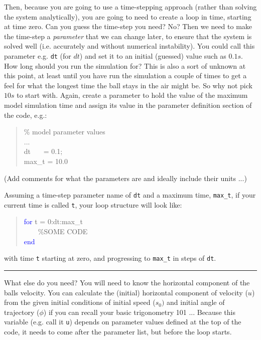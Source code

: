 \documentclass{tufte-book} %
\newenvironment{docspec}{\begin{quotation}\ttfamily\parskip0pt\parindent0pt\ignorespaces}{\end{quotation}}
\begin{document}
Then, because you are going to use a time-stepping approach (rather than solving the system analytically), you are going to need to create a loop in time, starting at time zero. Can you guess the time-step you need? No? Then we need to make the time-step a \textit{parameter} that we can change later, to ensure that the system is solved well (i.e. accurately and without numerical instability). You could call this parameter e.g. \texttt{dt} (for \(dt\)) and set it to an initial (guessed) value such as \(0.1s\). How long should you run the simulation for? This is also a sort of unknown at this point, at least until you have run the simulation a couple of times to get a feel for what the longest time the ball stays in the air might be. So why not pick \(10s\) to start with. Again, create a parameter to hold the value of the maximum model simulation time and assign its value in the parameter definition section of the code, e.g.:
\begin{docspec}
\textcolor[rgb]{0,0.501961,0}{\% model parameter values}\\
...\\
dt \ \ \ = 0.1;\\
max\_t = 10.0
\end{docspec}
(Add comments for what the parameters are and ideally include their units ...)

Assuming a time-step parameter name of \texttt{dt} and a maximum time, \texttt{max\_t}, if your current time is called \texttt{t}, your loop structure will look like:
\begin{docspec}
\textcolor{blue}{for} t = 0:dt:max\_t
\\ \ \ \ \ \textcolor[rgb]{0,0.501961,0}{\%SOME CODE}
\\\textcolor{blue}{end}
\end{docspec}
with time \texttt{t} starting at zero, and progressing to \texttt{max\_t} in steps of \texttt{dt}.

\vspace{1mm}
\noindent\rule{4cm}{0.5pt}
\vspace{2mm}

\noindent What else do you need? You will need to know the horizontal component of the balls velocity.  You can calculate the (initial) horizontal component of velocity (\(u\)) from the given initial conditions of initial speed (\(s_{0})\) and initial angle of trajectory (\(\phi\)) if you can recall your basic trigonometry 101 ... Because this variable (e.g. call it \texttt{u}) depends on parameter values defined at the top of the code, it needs to come after the parameter list, but before the loop starts. 
\end{document}

